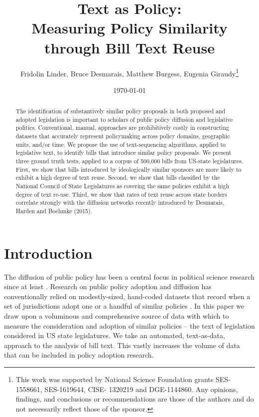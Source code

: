 \documentclass[12pt]{article} %
\begin{document}
 


\title{Text as Policy: \\ Measuring Policy Similarity through Bill Text Reuse}
\date{\today}
\author{Fridolin Linder, Bruce Desmarais, Matthew Burgess, Eugenia
Giraudy\footnote{This work was supported by National Science Foundation grants
SES-1558661, SES-1619644, CISE-
1320219 and DGE-1144860. Any opinions, findings, and conclusions or
recommendations are those of the
authors and do not necessarily reflect those of the sponsor.}}

\maketitle




\singlespacing
\begin{abstract} 
    \noindent The identification of substantively similar policy proposals in both proposed and adopted legislation is important to scholars of public policy diffusion and legislative politics. Conventional, manual, approaches are prohibitively costly in constructing datasets that accurately represent policymaking across policy domains, geographic units, and/or time. We propose the use of text-sequencing algorithms, applied to legislative text, to identify bills that introduce similar policy proposals. We present three ground truth tests, applied to a corpus of 500,000 bills from US-state legislatures. First, we show that bills introduced by ideologically similar sponsors are more likely to exhibit a high degree of text reuse. Second, we show that bills classified by the National Council of State Legislatures as covering the same policies exhibit a high degree of text re-use. Third, we show that rates of text reuse across state borders correlate strongly with the diffusion networks recently introduced by Desmarais, Harden and Boehmke (2015).

\end{abstract}

\doublespacing
\clearpage


\section{Introduction} 

The diffusion of public policy has been a central focus in political science research since at least \citet{walker1969}. Research on public policy adoption and diffusion has conventionally relied on modestly-sized, hand-coded datasets that record when a set of jurisdictions adopt one or a handful of similar policies \citep{boehmke2012}. In this paper we draw upon a voluminous and comprehensive source of data with which to measure the consideration and adoption of similar policies -- the text of legislation considered in US state legislatures. We take an automated, text-as-data, approach to the analysis of bill text. This vastly increases the volume of data that can be included in policy adoption research. 
\end{document}
